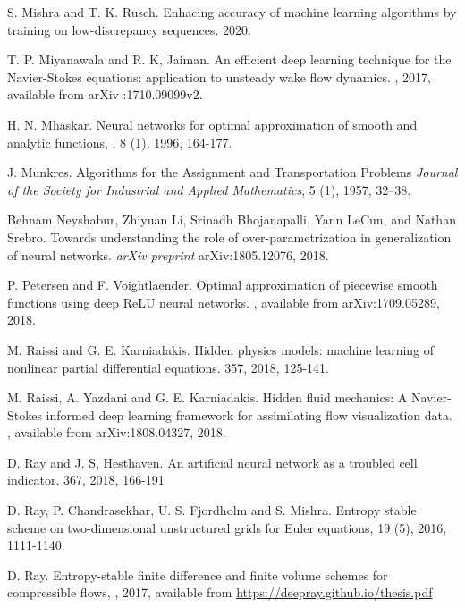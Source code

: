 \documentclass[a4paper]{article}
\numberwithin{equation}{section}
\numberwithin{equation}{section}
\theoremstyle{definition}
\theoremstyle{myremarkstyle}
\begin{document}
\begin{thebibliography}{99}
S. Mishra and T. K. Rusch.
\newblock Enhacing accuracy of machine learning algorithms by training on low-discrepancy sequences. 
 2020. 

T. P. Miyanawala and R. K, Jaiman.
\newblock An efficient deep learning technique for the Navier-Stokes equations: application to unsteady wake flow dynamics.
, 2017, available from arXiv :1710.09099v2.

H. N. Mhaskar.
\newblock Neural networks for optimal approximation of smooth and analytic functions,
, 8 (1), 1996, 164-177.

J. Munkres.
\newblock Algorithms for the Assignment and Transportation Problems
\newblock \textit{Journal of the Society for Industrial and Applied Mathematics}, 5 (1), 1957, 32--38.

Behnam Neyshabur, Zhiyuan Li, Srinadh Bhojanapalli, Yann LeCun, and Nathan Srebro. 
\newblock Towards understanding the role of over-parametrization in generalization of neural networks. 
{\em arXiv
preprint} arXiv:1805.12076, 2018.

P. Petersen and F. Voightlaender.
\newblock Optimal approximation of piecewise smooth functions using deep ReLU neural networks.
, available from  arXiv:1709.05289, 2018. 


M. Raissi and G. E. Karniadakis.
\newblock Hidden physics models: machine learning of nonlinear partial differential equations.
 357, 2018, 125-141.

M. Raissi, A. Yazdani and G. E. Karniadakis.
\newblock Hidden fluid mechanics: A Navier-Stokes informed deep learning framework for assimilating flow visualization data.
, available from  arXiv:1808.04327, 2018. 


D. Ray and J. S, Hesthaven.
\newblock An artificial neural network as a troubled cell indicator.
  367, 2018, 166-191

 D. Ray, P. Chandrasekhar, U. S. Fjordholm and S. Mishra.
 \newblock Entropy stable scheme on two-dimensional unstructured grids for Euler equations, 
  19 (5), 2016, 1111-1140.
 
 D. Ray.
 \newblock Entropy-stable finite difference and finite volume schemes for compressible flows,
 , 2017, available from \url{https://deepray.github.io/thesis.pdf} 


\end{thebibliography}
\end{document}
